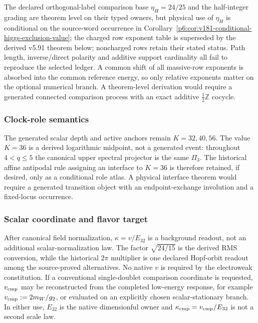 \documentclass[11pt,a4paper]{article}
\begin{document}
The declared orthogonal-label comparison base $\eta_H=24/25$ and the
half-integer grading are theorem level on their typed owners, but physical
use of $\eta_H$ is conditional on the source-word occurrence in
Corollary~\ref{p6:cor:v181-conditional-higgs-exclusion-value}; the charged row exponent table is superseded by the derived v5.91 theorem below; noncharged rows retain their stated status.  Path length, inverse/direct polarity
and additive support cardinality all fail to reproduce the selected ledger.
A common shift of all massive-row exponents is absorbed into the common
reference energy, so only relative exponents matter on the optional numerical
branch.  A theorem-level derivation would require a generated connected
comparison process with an exact additive $\tfrac12\mathbb Z$ cocycle.

\subsubsection{Clock-role semantics}
The generated scalar depth and active anchors remain
$K=32,40,56$.  The value $K=36$ is a derived logarithmic midpoint, not a
generated event: throughout $4<q\le5$ the canonical upper spectral projector
is the same $\Pi_3$.  The historical affine antipodal rule assigning an
interface to $K=36$ is therefore retained, if desired, only as a conditional
role atlas.  A physical interface theorem would require a generated transition
object with an endpoint-exchange involution and a fixed-locus occurrence.

\subsubsection{Scalar coordinate and flavor target}
After canonical field normalization, $\kappa=v/E_{32}$ is a background readout,
not an additional scalar-normalization law.  The factor $\sqrt{24/15}$ is the
derived RMS conversion, while the historical $2\pi$ multiplier is one declared
Hopf-orbit readout among the source-proved alternatives.  No native $v$ is required by the electroweak constitution.  If a conventional single-doublet comparison coordinate is requested, $v_{\rm cmp}$ may be reconstructed from the completed low-energy response, for example $v_{\rm cmp}:=2m_W/g_2$, or evaluated on an explicitly chosen scalar-stationary branch.  In either use, $E_{32}$ is the native dimensionful owner and $\kappa_{\rm cmp}=v_{\rm cmp}/E_{32}$ is not a second scale law.
\end{document}

